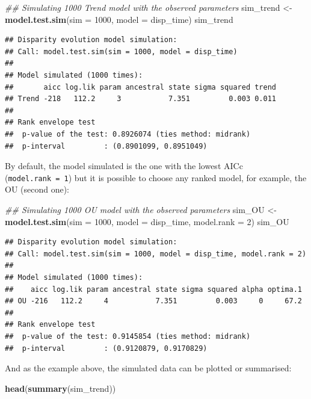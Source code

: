\documentclass[]{book}
\newenvironment{Shaded}{\begin{snugshade}}{\end{snugshade}}
\newcommand{\CommentTok}[1]{\textcolor[rgb]{0.56,0.35,0.01}{\textit{#1}}}
\newcommand{\DataTypeTok}[1]{\textcolor[rgb]{0.13,0.29,0.53}{#1}}
\newcommand{\DecValTok}[1]{\textcolor[rgb]{0.00,0.00,0.81}{#1}}
\newcommand{\KeywordTok}[1]{\textcolor[rgb]{0.13,0.29,0.53}{\textbf{#1}}}
\newcommand{\NormalTok}[1]{#1}
\newcommand{\StringTok}[1]{\textcolor[rgb]{0.31,0.60,0.02}{#1}}
\begin{document}
\begin{Shaded}
\begin{Highlighting}[]
\CommentTok{## Simulating 1000 Trend model with the observed parameters}
\NormalTok{sim_trend <-}\StringTok{ }\KeywordTok{model.test.sim}\NormalTok{(}\DataTypeTok{sim =} \DecValTok{1000}\NormalTok{, }\DataTypeTok{model =}\NormalTok{ disp_time)}
\NormalTok{sim_trend}
\end{Highlighting}
\end{Shaded}

\begin{verbatim}
## Disparity evolution model simulation:
## Call: model.test.sim(sim = 1000, model = disp_time) 
## 
## Model simulated (1000 times):
##       aicc log.lik param ancestral state sigma squared trend
## Trend -218   112.2     3           7.351         0.003 0.011
## 
## Rank envelope test
##  p-value of the test: 0.8926074 (ties method: midrank)
##  p-interval         : (0.8901099, 0.8951049)
\end{verbatim}

By default, the model simulated is the one with the lowest AICc (\texttt{model.rank\ =\ 1}) but it is possible to choose any ranked model, for example, the OU (second one):

\begin{Shaded}
\begin{Highlighting}[]
\CommentTok{## Simulating 1000 OU model with the observed parameters}
\NormalTok{sim_OU <-}\StringTok{ }\KeywordTok{model.test.sim}\NormalTok{(}\DataTypeTok{sim =} \DecValTok{1000}\NormalTok{, }\DataTypeTok{model =}\NormalTok{ disp_time,}
                         \DataTypeTok{model.rank =} \DecValTok{2}\NormalTok{)}
\NormalTok{sim_OU}
\end{Highlighting}
\end{Shaded}

\begin{verbatim}
## Disparity evolution model simulation:
## Call: model.test.sim(sim = 1000, model = disp_time, model.rank = 2) 
## 
## Model simulated (1000 times):
##    aicc log.lik param ancestral state sigma squared alpha optima.1
## OU -216   112.2     4           7.351         0.003     0     67.2
## 
## Rank envelope test
##  p-value of the test: 0.9145854 (ties method: midrank)
##  p-interval         : (0.9120879, 0.9170829)
\end{verbatim}

And as the example above, the simulated data can be plotted or summarised:

\begin{Shaded}
\begin{Highlighting}[]
\KeywordTok{head}\NormalTok{(}\KeywordTok{summary}\NormalTok{(sim_trend))}
\end{Highlighting}
\end{Shaded}
\end{document}
